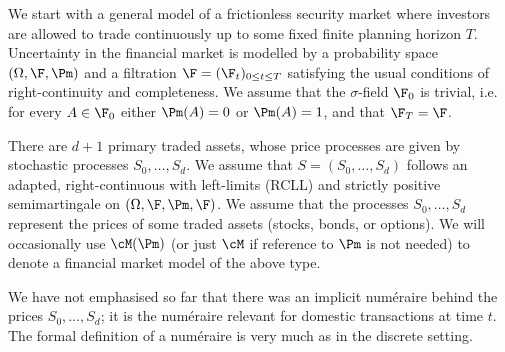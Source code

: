 We start with a general model of a frictionless security market where investors are allowed to trade continuously up to some fixed finite planning horizon $T$. Uncertainty in the financial market is modelled by a probability space $(\Omega, \F, \Pm)$ and a filtration $\F = (\F_t)_{0 \le t \le T}$ satisfying the usual conditions of right-continuity and completeness. We assume that the $\sigma$-field $\F_0$ is trivial, i.e. for every $A \in \F_0$ either $\Pm(A) = 0$ or $\Pm(A) = 1$, and that $\F_T = \F$.

There are $d+1$ primary traded assets, whose price processes are given by stochastic processes $S_0, \dots, S_d$. We assume that $S = (S_0, \dots, S_d)$ follows an adapted, right-continuous with left-limits (RCLL) and strictly positive semimartingale on $(\Omega, \F, \Pm, \F)$. We assume that the processes $S_0, \dots, S_d$ represent the prices of some traded assets (stocks, bonds, or options). We will occasionally use $\cM(\Pm)$ (or just $\cM$ if reference to $\Pm$ is not needed) to denote a financial market model of the above type.

We have not emphasised so far that there was an implicit num\'{e}raire behind the prices $S_0, \dots, S_d$; it is the num\'{e}raire relevant for domestic transactions at time $t$. The formal definition of a num\'{e}raire is very much as in the discrete setting.

